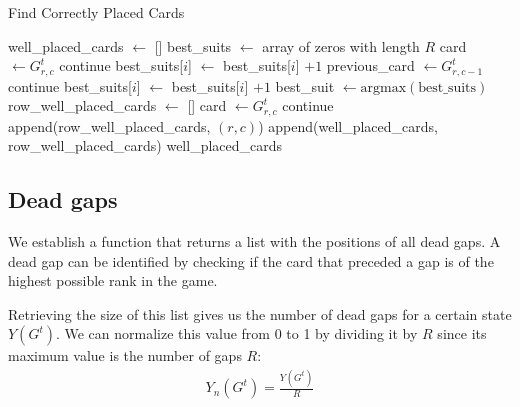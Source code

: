 \begin{algorithm}[H]
    \caption{Find Correctly Placed Cards}
    \label{algo:wellplaced}
    \begin{algorithmic}
        \State well\_placed\_cards $\gets$ []
            \State best\_suits $\gets$ array of zeros with length $R$
                \State card $\gets G^t_{r,c}$
                    \State continue
                \EndIf
                    \State best\_suits[$i$] $\gets$ best\_suits[$i$] $+ 1$
                \EndIf
                    \State previous\_card $\gets G^t_{r,c-1}$
                        \State continue
                    \EndIf
                        \State best\_suits[$i$] $\gets$ best\_suits[$i$] $+ 1$
                    \EndIf
                \EndIf
            \EndFor
            \State best\_suit $\gets \text{argmax}(\text{best\_suits})$
            \State row\_well\_placed\_cards $\gets$ []
                \State card $\gets G^t_{r,c}$
                    \State continue
                \EndIf
                    \State append(row\_well\_placed\_cards, $(r,c)$)
                \EndIf
            \EndFor
            \State append(well\_placed\_cards, row\_well\_placed\_cards)
        \EndFor
        \State \Return well\_placed\_cards
    \end{algorithmic}
\end{algorithm}

\newpage
\subsection{Dead gaps}
We establish a function that returns a list with the positions of all dead gaps. A dead gap can be identified by checking if the card that preceded a gap is of the highest possible rank in the game.

Retrieving the size of this list gives us the number of dead gaps for a certain state $Y\left(G^t\right)$. We can normalize this value from 0 to 1 by dividing it by $R$ since its maximum value is the number of gaps $R$:
\begin{align}
    Y_n\left(G^t\right) = \frac{Y\left(G^t\right)}{R}
\end{align}

